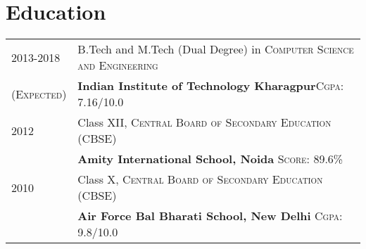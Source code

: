 \documentclass[a4paper,10pt]{extarticle} %
\begin{document}



\section{Education}

\begin{tabular}{R{3.0cm}|p{15.0cm}}	
2013-2018 & B.Tech and M.Tech (Dual Degree) in \textsc{Computer Science and Engineering}\\
\textsc{(Expected)}&\textbf{Indian Institute of Technology Kharagpur}\hfill\textsc{Cgpa}: 7.16/10.0\\



2012& Class XII, \textsc{}\textsc{Central Board of Secondary Education (CBSE)} \\
&\normalsize\textbf{Amity International School, Noida} \hfill\textsc{Score}: 89.6\%\\



2010 & Class X, \textsc{}\textsc{Central Board of Secondary Education (CBSE)} \\
&\normalsize\textbf{Air Force Bal Bharati School, New Delhi} \hfill\textsc{Cgpa}: 9.8/10.0\\

\end{tabular}

\end{document}
